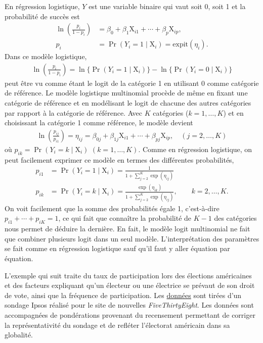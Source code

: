 \documentclass[
  11pt,
  letterpaper,
]{book}
\theoremstyle{definition}
\theoremstyle{remark}
\begin{document}
En régression logistique, \(Y\) est une variable binaire qui vaut soit
0, soit 1 et la probabilité de succès est \begin{align*}
\ln\left(\frac{p_i}{1-p_i}\right) &= \beta_0 + \beta_1 \mathrm{X}_{i1} + \cdots + \beta_p\mathrm{X}_{ip},\\p_i &= \Pr(Y_i=1 \mid \mathrm{X}_i) = \textrm{expit}(\eta_i).
\end{align*} Dans ce modèle logistique,
\begin{align*}\ln\left(\frac{p_i}{1-p_i}\right) = \ln\{\Pr(Y_i=1 \mid \mathrm{X}_i)\} -  \ln\{\Pr(Y_i=0 \mid \mathrm{X}_i)\}
\end{align*} peut être vu comme étant le logit de la catégorie 1 en
utilisant 0 comme catégorie de référence. Le modèle logistique
multinomial procède de même en fixant une catégorie de référence et en
modélisant le logit de chacune des autres catégories par rapport à la
catégorie de référence. Avec \(K\) catégories (\(k = 1, \ldots, K\)) et
en choisissant la catégorie 1 comme référence, le modèle devient
\begin{align*}
 \ln\left(\frac{p_{ij}}{p_{i1}}\right) = \eta_{ij} = \beta_{0j} + \beta_{1j} \mathrm{X}_{i1} + \cdots + \beta_{pj}\mathrm{X}_{ip}, \quad (j=2, \ldots, K)
\end{align*} où \(p_{ik} = \Pr(Y_i=k \mid \mathrm{X}_i)\)
\((k=1, \ldots, K)\). Comme en régression logistique, on peut facilement
exprimer ce modèle en termes des différentes probabilités,
\begin{align*}
 p_{i1} &= \Pr(Y_i=1 \mid \mathrm{X}_i) = \frac{1}{1+ \sum_{j=2}^K\exp(\eta_{ij})}\\
 p_{ik} &= \Pr(Y_i=k \mid \mathrm{X}_i) = \frac{\exp(\eta_{ik})}{1+ \sum_{j=2}^K\exp(\eta_{ij})}, \qquad k=2, \ldots, K.
\end{align*} On voit facilement que la somme des probabilités égale 1,
c'est-à-dire \(p_{i1} + \cdots + p_{iK} = 1\), ce qui fait que connaître
la probabilité de \(K-1\) des catégories nous permet de déduire la
dernière. En fait, le modèle logit multinomial ne fait que combiner
plusieurs logit dans un seul modèle. L'interprétation des paramètres se
fait comme en régression logistique sauf qu'il faut y aller équation par
équation.

L'exemple qui suit traite du taux de participation lors des élections
américaines et des facteurs expliquant qu'un électeur ou une électrice
se prévaut de son droit de vote, ainsi que la fréquence de
participation. Les
\href{https://github.com/fivethirtyeight/data/tree/master/non-voters}{données}
sont tirées d'un sondage Ipsos réalisé pour le site de nouvelles
\emph{FiveThirtyEight}. Les données sont accompagnées de pondérations
provenant du recensement permettant de corriger la représentativité du
sondage et de refléter l'électorat américain dans sa globalité.
\end{document}

